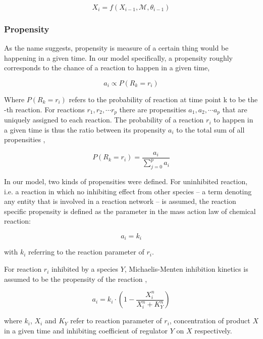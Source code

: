 \documentclass{bioinfo}
\begin{document}
\begin{equation}
X_i = f(X_{i - 1}, \mathcal{M}, \theta_{i - 1})\label{eq:02}
\end{equation}

\subsubsection{Propensity}

As the name suggests, propensity is measure of a certain thing would be happening in a given time. In our model specifically, a propensity roughly corresponds to the chance of a reaction to happen in a given time,

\begin{equation}
a_i \propto P(R_k = r_i)
\end{equation}

Where $P(R_k = r_i)$ refers to the probability of reaction at time point k to be the -th reaction. For reactions $r_1, r_2, \cdots r_p$ there are propensities $a_1, a_2, \cdots a_p$ that are uniquely assigned to each reaction. The probability of a reaction $r_i$ to happen in a given time is thus the ratio between its propensity $a_i$ to the total sum of all propensities \citep{Gillespie77},

\begin{equation}
P(R_k = r_i) = \frac{a_i}{\sum_{j=0}^{p} a_i}
\end{equation}

In our model, two kinds of propensities were defined. For uninhibited reaction, i.e. a reaction in which no inhibiting effect from other species -- a term denoting any entity that is involved in a reaction network -- is assumed, the reaction specific propensity is defined as the parameter in the mass action law of chemical reaction:

\begin{equation}
a_i = k_i \label{eq:23}
\end{equation}

with $k_i$ referring to the reaction parameter of $r_i$.

For reaction $r_i$ inhibited by a species $Y$, Michaelis-Menten inhibition kinetics is assumed to be the propensity of the reaction \citep{MichaelisMenten13},

\begin{equation}
a_i = k_i \cdot (1 - \frac{X_i^{n}}{X_i^{n} + K_{Y}^{n}})\label{eq:24}
\end{equation}

where $k_i$, $X_i$ and $K_{Y}$ refer to reaction parameter of $r_i$, concentration of product $X$ in a given time and inhibiting coefficient of regulator $Y$ on $X$ respectively.
\end{document}
